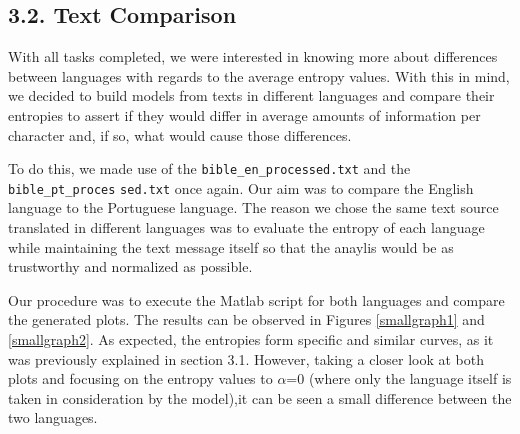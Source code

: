 \documentclass[12pt]{article}
\begin{document}
\subsection*{3.2. Text Comparison}

With all tasks completed, we were interested in knowing more about differences
between languages with regards to the average entropy values.
With this in mind, we decided to build models from texts in different languages
and compare their entropies to assert if they would differ in average amounts
of information per character and, if so, what would cause those differences. 

To do this, we made use of the \texttt{bible\_en\_processed.txt} and the 
\texttt{bible\_pt\_proces} \texttt{sed.txt} once again.
Our aim was to compare the English language to the Portuguese language. 
The reason we chose the same text source translated in different languages
was to evaluate the entropy of each language while maintaining the text message
itself so that the anaylis would be as trustworthy and normalized as possible.

Our procedure was to execute the Matlab script for both languages and compare
the generated plots.
The results can be observed in Figures \ref{smallgraph1} and \ref{smallgraph2}.
As expected, the entropies form specific and similar curves, as it was 
previously explained in section 3.1. 
However, taking a closer look at both plots and focusing on the entropy values 
to $\alpha$=0 (where only the language itself is taken in consideration by the 
model),it can be seen a small difference between the two languages.
\end{document}
